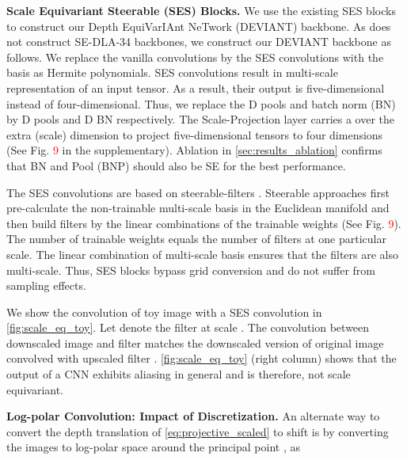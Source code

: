 \documentclass[runningheads]{llncs}
\newcommand{\twoD}{D}
\newcommand{\threeD}{D}
\newcommand{\equivariant} {equivariant}
\newcommand{\Equivariant} {Equivariant}
\newcommand{\scaleEquivariant} {scale \equivariant}
\newcommand{\ScaleEquivariant} {Scale \Equivariant}
\newcommand{\MaxScale}{Scale-Projection}
\newcommand{\ses}{SES}
\newcommand{\se}{SE}
\newcommand{\manifold}{manifold}
\newcommand{\logPolar}{log-polar}
\newcommand{\LogPolar}{Log-polar}
\newcommand{\dla}{DLA-34}
\newcommand{\noIndentHeading}[1]{\noindent\textbf{#1}}
\newcommand{\refSupFigure}[1]{Fig. \textcolor{red}{#1}}
\newcommand{\methodName}{DEVIANT}
\newcommand{\methodNameFull}{Depth EquiVarIAnt NeTwork}
\begin{document}
\noIndentHeading{\ScaleEquivariant{} Steerable (\ses) Blocks.}\label{sec:steerable}    
            We use the existing \ses{} blocks \cite{sosnovik2020sesn,sosnovik2021siamese} to construct our \methodNameFull{} (\methodName{}) backbone.
            As \cite{sosnovik2021siamese} does not construct \se-\dla{} backbones, we construct our \methodName{} backbone as follows.
            We replace the vanilla convolutions by the \ses{} convolutions \cite{sosnovik2021siamese} with the basis as Hermite polynomials.
            \ses{} convolutions result in multi-scale representation of an input tensor. 
            As a result, their output is five-dimensional instead of four-dimensional. 
            Thus, we replace the \twoD{} pools and batch norm (BN) by \threeD{} pools and \threeD{} BN respectively.
            The \MaxScale{} layer \cite{sosnovik2020sesn} carries a  over the extra (scale) dimension to project five-dimensional tensors to four dimensions (See \refSupFigure{9} in the supplementary). Ablation in \cref{sec:results_ablation} confirms that BN and Pool (BNP) should also be \se{} for the best performance.
            
            The \ses{} convolutions \cite{ghosh2019scale, zhu2019scale, sosnovik2020sesn} are based on steerable-filters \cite{freeman1991design}.
            Steerable approaches \cite{ghosh2019scale} first pre-calculate the non-trainable multi-scale basis in the Euclidean \manifold{} and then build filters by the linear combinations of the trainable weights  (See \refSupFigure{9}).
            The number of trainable weights  equals the number of filters at one particular scale. 
            The linear combination of multi-scale basis ensures that the filters are also multi-scale.
            Thus, \ses{} blocks bypass grid conversion and do not suffer from sampling effects.
            
            We show the convolution of toy image  with a \ses{} convolution in \cref{fig:scale_eq_toy}. Let  denote the filter at scale .
            The convolution between downscaled image and filter  matches the downscaled version of original image convolved with upscaled filter . 
            \cref{fig:scale_eq_toy} (right column) shows that the output of a CNN  exhibits aliasing in general and is therefore, not \scaleEquivariant. 
            

\noIndentHeading{\LogPolar{} Convolution: Impact of Discretization.}\label{sec:log_polar}
            An alternate way to convert the depth translation  of \cref{eq:projective_scaled} to shift is by converting the images to \logPolar{} space \cite{zwicke1983new} around the principal point , as
            
\end{document}

